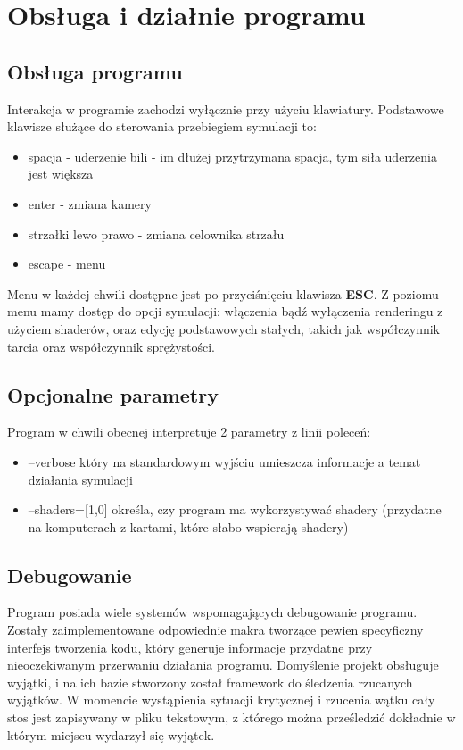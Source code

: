 \section{Obsługa i działnie programu}
\subsection{Obsługa programu}

Interakcja w programie zachodzi wyłącznie przy użyciu klawiatury. 
Podstawowe klawisze służące do sterowania przebiegiem symulacji to:
\begin{itemize}
 \item spacja - uderzenie bili - im dłużej przytrzymana spacja, tym siła uderzenia jest większa
 \item enter - zmiana kamery
 \item strzałki lewo prawo - zmiana celownika strzału
 \item escape - menu
\end{itemize}


Menu w każdej chwili dostępne jest po przyciśnięciu klawisza \textbf{ESC}.
Z poziomu menu mamy dostęp do opcji symulacji: włączenia bądź wyłączenia renderingu z użyciem shaderów, oraz
edycję podstawowych stałych, takich jak współczynnik tarcia oraz współczynnik sprężystości.

\subsection{Opcjonalne parametry}

Program w chwili obecnej interpretuje 2 parametry z linii poleceń:
\begin{itemize}
 \item --verbose który na standardowym wyjściu umieszcza informacje a temat działania symulacji
 \item --shaders=[1,0] określa, czy program ma wykorzystywać shadery (przydatne na komputerach z kartami, które słabo wspierają shadery) 
\end{itemize}

\subsection{Debugowanie}

Program posiada wiele systemów wspomagających debugowanie programu. Zostały zaimplementowane odpowiednie makra tworzące
pewien specyficzny interfejs tworzenia kodu, który generuje informacje przydatne przy nieoczekiwanym przerwaniu działania programu. Domyślenie projekt obsługuje wyjątki, i na ich bazie stworzony został framework do śledzenia rzucanych wyjątków. W momencie wystąpienia sytuacji krytycznej i rzucenia wątku cały stos jest zapisywany w pliku tekstowym, z którego można prześledzić dokładnie w którym miejscu wydarzył się wyjątek.